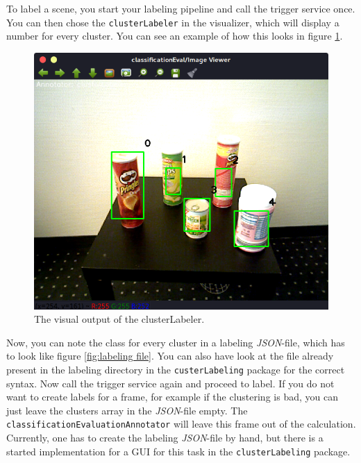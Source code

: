 \documentclass[main.tex]{subfiles}
\begin{document}
To label a scene, you start your labeling pipeline and call the trigger service once. You can then chose the \texttt{clusterLabeler} in the visualizer, which will display a number for every cluster. You can see an example of how this looks in figure \ref{fig:clusterLabeler visualization}.
\begin{figure}
  \includegraphics[width=\linewidth]{pictures/perception/cluster_numbering.png}
  \caption{The visual output of the clusterLabeler.}
  \label{fig:clusterLabeler visualization}
\end{figure}

\newpage

Now, you can note the class for every cluster in a labeling \textit{JSON}-file, which has to look like figure \ref{fig:labeling file}. You can also have look at the file already present in the labeling directory in the \texttt{custerLabeling} package for the correct syntax. Now call the trigger service again and proceed to label. If you do not want to create labels for a frame, for example if the clustering is bad, you can just leave the clusters array in the \textit{JSON}-file empty. The \texttt{classificationEvaluationAnnotator} will leave this frame out of the calculation. Currently, one has to create the labeling \textit{JSON}-file by hand, but there is a started implementation for a GUI for this task in the \texttt{clusterLabeling} package.
\end{document}
